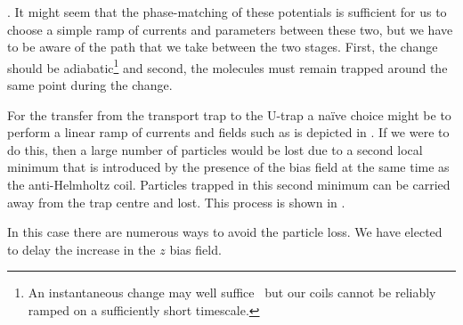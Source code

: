 .
It might seem that the phase-matching of these potentials is sufficient for us
to choose a simple ramp of currents and parameters between these two, but we
have to be aware of the path that we take between the two stages. First, the
change should be adiabatic\footnote{An instantaneous change may well
suffice~\cite{} but our coils cannot be reliably ramped on a sufficiently short
timescale.} and second, the molecules must remain trapped around the same point
during the change.

For the transfer from the transport trap to the U-trap a na\"ive choice might
be to perform a linear ramp of currents and fields such as is depicted in
 . If we were to do this, then a large
number of particles would be lost due to a second local minimum that
is introduced by the presence of the bias field at the same time as the
anti-Helmholtz coil. Particles trapped in this second minimum can be carried
away from the trap centre and lost. This process is shown in
.

\begin{figure}[h]
\centering
  \caption{}
  \label{design:fig:badramp}
\end{figure}

In this case there are numerous ways to avoid the particle loss. We have
elected to delay the increase in the $z$ bias field. 




